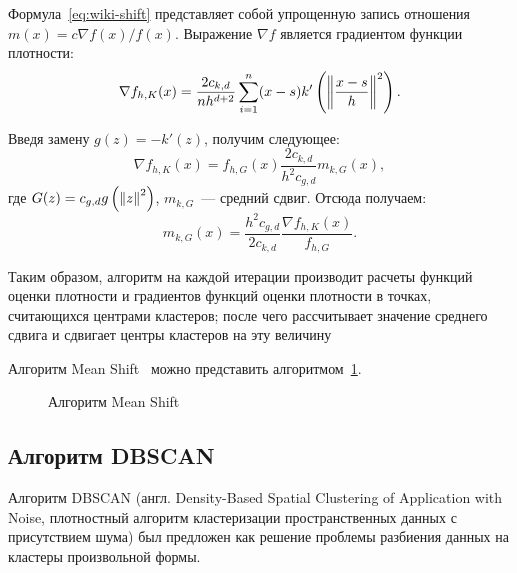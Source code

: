 Формула~\eqref{eq:wiki-shift} представляет собой упрощенную запись отношения\linebreak \( m(x) = c\nabla f(x) / f(x) \). Выражение \( \nabla f \) является градиентом функции плотности:
\[
    \nabla f_{h, K}(x) = \frac{2c_{k, d}}{nh^{d+2}}\sum_{i=1}^n (x - s)k'\left(\left\|\frac{x - s}{h}\right\|^2\right).
\]

Введя замену \( g(z) = -k'(z) \), получим следующее:
\[
    \nabla f_{h, K}(x) = f_{h, G}(x)\frac{2c_{k, d}}{h^2c_{g, d}}m_{k, G}(x),
\]
где \( G(z) = c_{g, d} g\left(\left\|z\right\|^2\right) \), \( m_{k, G} \)~--- средний сдвиг. Отсюда получаем:
\begin{equation}
    m_{k, G}(x) = \frac{h^2c_{g, d}}{2c_{k, d}}\frac{\nabla f_{h, K}(x)}{f_{h, G}}.
    \label{eq:themeanshift}
\end{equation}

Таким образом, алгоритм на каждой итерации производит расчеты функций оценки плотности и градиентов функций оценки плотности в точках, считающихся центрами кластеров; после чего рассчитывает значение среднего сдвига и сдвигает центры кластеров на эту величину

Алгоритм Mean Shift~\cite[с. 235-236]{algms} можно представить алгоритмом~\ref{alg:meanshift}.
\begin{figure}[ht!]
    \begin{algorithm}[H]
    \end{algorithm}
    \vspace*{-1.5em}
    \caption{Алгоритм Mean Shift}
    \label{alg:meanshift}
\end{figure}

\subsection{Алгоритм DBSCAN} \label{sec:dbscan}
Алгоритм DBSCAN (англ. Density-Based Spatial Clustering of Application with Noise, плотностный алгоритм кластеризации пространственных данных с присутствием шума) был предложен как решение проблемы разбиения данных на кластеры произвольной формы.

